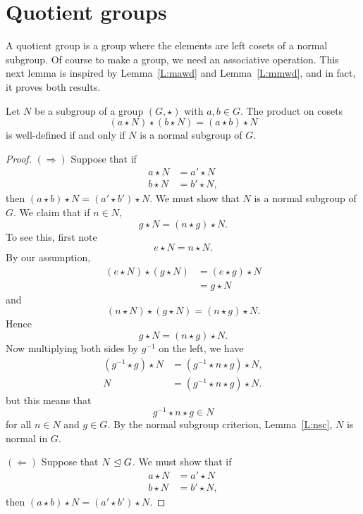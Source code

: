 \documentclass{ximera}
\begin{document}
\section{Quotient groups}

A quotient group is a group where the elements are left cosets of a
normal subgroup. Of course to make a group, we need an associative
operation.  This next lemma is inspired by Lemma~\ref{L:mawd} and
Lemma~\ref{L:mmwd}, and in fact, it proves both results.

\begin{lemma}\label{L:cpwd}
  Let $N$ be a subgroup of a group $(G,\star)$ with $a,b\in G$.  The
  product on cosets
  \[
  (a\star N) \star (b\star N ) = (a\star b)\star N
  \]
  is well-defined if and only if $N$ is a normal subgroup of $G$.
  \begin{proof}
        $(\Rightarrow)$ Suppose that if
    \begin{align*}
      a\star N &= a'\star N\\
      b\star N &= b'\star N,
    \end{align*}
    then $(a\star b) \star N = (a'\star b')\star N$. We must show that
    $N$ is a normal subgroup of $G$. We claim that if $n\in N$,
    \[
    g \star N = (n\star g)\star N.
    \]
    To see this, first note
    \[
    e \star N = n \star N.
    \]
    By our assumption,
    \begin{align*}
    (e\star N) \star (g\star N) &= (e\star g)\star N \\
    &= g\star N
    \end{align*}
    and
    \[
    (n\star N) \star (g\star N) = (n\star g)\star N.
    \]
    Hence
    \[
    g\star N = (n\star g)\star N.
    \]
    Now multiplying both sides by $g^{-1}$ on the left, we have
    \begin{align*}
      (g^{-1}\star g)\star N &= (g^{-1} \star n\star g)\star N,\\
      N &= (g^{-1} \star n\star g)\star N.
    \end{align*}
    but this means that
    \[
    g^{-1} \star n\star g \in N
    \]
    for all $n\in N$ and $g\in G$. By the normal subgroup criterion,
    Lemma~\ref{L:nsc}, $N$ is normal in $G$.

    
    $(\Leftarrow)$ Suppose that $N\trianglelefteq G$. We must show that if
    \begin{align*}
      a\star N &= a'\star N\\
      b\star N &= b'\star N,
    \end{align*}
    then $(a\star b) \star N = (a'\star b')\star N$.



\end{proof}
\end{lemma}
\end{document}
